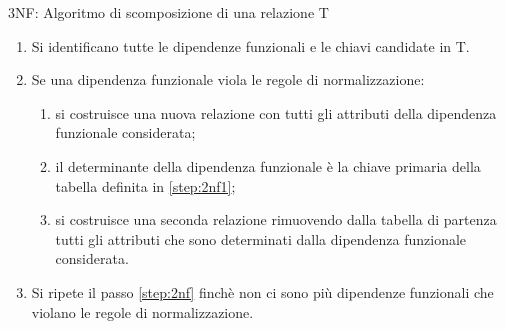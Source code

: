 \begin{frame}{3NF: Algoritmo di scomposizione di una relazione T}
\begin{minipage}{0.8\textwidth}
\begin{enumerate}
    \item Si identificano tutte le dipendenze funzionali e le chiavi candidate in T.
    \item Se una dipendenza funzionale viola le regole di normalizzazione:\label{step:2nf}
    \begin{minipage}{0.8\textwidth}
    \begin{enumerate}[a]
        \item si costruisce una nuova relazione con tutti gli attributi della dipendenza funzionale considerata;\label{step:2nf1}
        \item il determinante della dipendenza funzionale \`e la chiave primaria della tabella definita in \ref{step:2nf1};
        \item si costruisce una seconda relazione rimuovendo dalla tabella di partenza tutti gli attributi che sono determinati dalla dipendenza funzionale considerata.
    \end{enumerate}
    \end{minipage}
    \item Si ripete il passo \ref{step:2nf} finch\`e non ci sono pi\`u dipendenze funzionali che violano le regole di normalizzazione.
\end{enumerate}
\end{minipage}
\end{frame}
%
